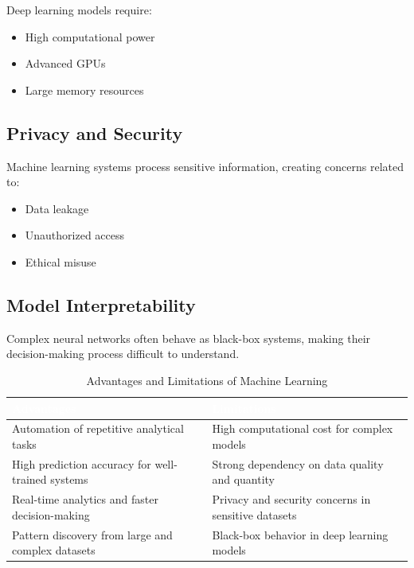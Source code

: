 \documentclass[11pt,a4paper]{article}
\begin{document}
Deep learning models require:
\begin{itemize}
    \item High computational power
    \item Advanced GPUs
    \item Large memory resources
\end{itemize}

\subsection{Privacy and Security}

Machine learning systems process sensitive information, creating concerns related to:
\begin{itemize}
    \item Data leakage
    \item Unauthorized access
    \item Ethical misuse
\end{itemize}

\subsection{Model Interpretability}

Complex neural networks often behave as black-box systems, making their decision-making process difficult to understand.

\begin{table}[H]
\centering
\caption{Advantages and Limitations of Machine Learning}
\renewcommand{\arraystretch}{1.35}
\begin{tabular}{>{\raggedright\arraybackslash}p{6.2cm} >{\raggedright\arraybackslash}p{6.2cm}}
\toprule
\rowcolor{prismblue}
\textcolor{white}{\textbf{Advantages}} & \textcolor{white}{\textbf{Limitations}} \\
\midrule
\rowcolor{prismlight}
Automation of repetitive analytical tasks & High computational cost for complex models \\
High prediction accuracy for well-trained systems & Strong dependency on data quality and quantity \\
\rowcolor{prismlight}
Real-time analytics and faster decision-making & Privacy and security concerns in sensitive datasets \\
Pattern discovery from large and complex datasets & Black-box behavior in deep learning models \\
\bottomrule
\end{tabular}
\end{table}
\end{document}
